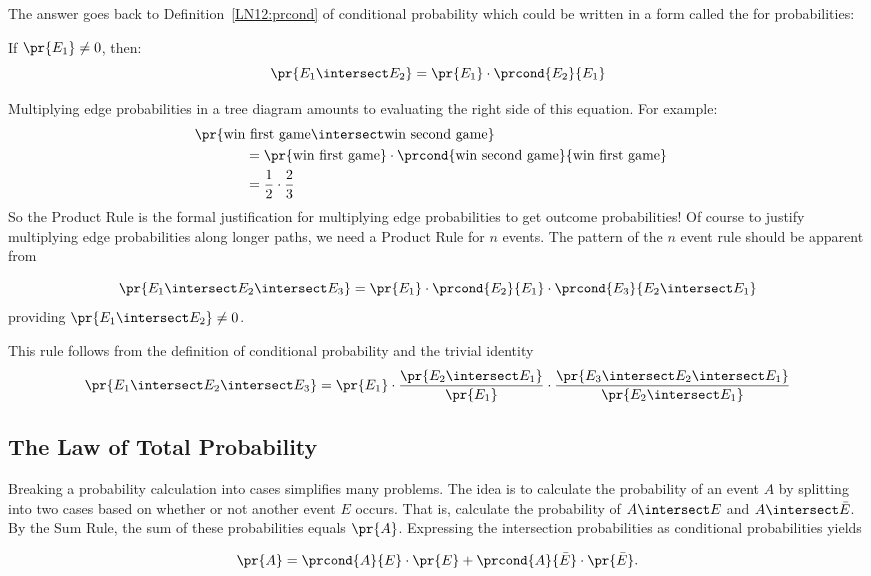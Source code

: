 The answer goes back to Definition~\ref{LN12:prcond} of conditional probability
which could be written in a form called the  for
probabilities:
%
\begin{rul*}
If $\pr{E_1} \neq 0$, then:
%
\[
\pr{E_1 \intersect E_2} = \pr{E_1} \cdot \prcond{E_2}{E_1}
\]
\end{rul*}
%
Multiplying edge probabilities in a tree diagram amounts to evaluating
the right side of this equation.  For example:
%
\begin{align*}
\lefteqn{\pr{\text{win first game} \intersect \text{win second game}}}
		\hspace{0.5in} \\
	& = \pr{\text{win first game}} \cdot
            \prcond{\text{win second game}}{\text{win first game}} \\
	& = \frac{1}{2} \cdot \frac{2}{3}
\end{align*}
%
So the Product Rule is the formal justification for multiplying edge
probabilities to get outcome probabilities!  Of course to justify
multiplying edge probabilities along longer paths, we need a Product Rule
for $n$ events.  The pattern of the $n$ event rule should be apparent from
\begin{rul*}
\[
\pr{E_1 \intersect E_2 \intersect E_3}
   = \pr{E_1} \cdot \prcond{E_2}{E_1} \cdot \prcond{E_3}{E_2 \intersect E_1}
\]
providing $\pr{E_1 \intersect E_2} \neq 0$.
\end{rul*}
This rule follows from the definition of conditional probability and the
trivial identity
\[
\pr{E_1 \intersect E_2 \intersect E_3} =
\pr{E_1}\cdot \frac{\pr{E_2 \intersect E_1}}{\pr{E_1}} \cdot
      \frac{\pr{E_3 \intersect E_2 \intersect E_1}}{\pr{E_2 \intersect E_1}}
\]


\subsection{The Law of Total Probability}

Breaking a probability calculation into cases simplifies many problems.
The idea is to calculate the probability of an event $A$ by splitting into
two cases based on whether or not another event $E$ occurs.  That is,
calculate the probability of $A \intersect E$ and $A \intersect \bar{E}$.
By the Sum Rule, the sum of these probabilities equals $\pr{A}$.
Expressing the intersection probabilities as conditional probabilities yields
\begin{rul*}
\[
\pr{A} = \prcond{A}{E} \cdot \pr{E} +
         \prcond{A}{\bar{E}} \cdot \pr{\bar{E}}.
\]
\end{rul*}

